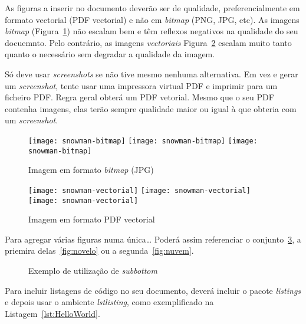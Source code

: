 As figuras a inserir no documento deverão ser de qualidade, preferencialmente em formato vectorial (PDF vectorial) e não em \emph{bitmap} (PNG, JPG, etc). As imagens \emph{bitmap} (Figura~\ref{fig:Figuras_Tree_silhouettes-bitmap}) não escalam bem e têm reflexos negativos na qualidade do seu docuemnto.  Pelo contrário, as imagens \emph{vectoriais} {Figura~\ref{fig:Figuras_Tree_silhouettes-vectorial}} escalam muito tanto quanto o necessário sem degradar a qualidade da imagem.

Só deve usar \emph{screenshots} se não tive mesmo nenhuma alternativa.  Em vez e gerar um \emph{screenshot}, tente usar uma impressora virtual PDF e imprimir para um ficheiro PDF. Regra geral obterá um PDF vetorial. Mesmo que o seu PDF contenha imagens, elas terão sempre qualidade maior ou igual à que obteria com um \emph{screenshot}.


\begin{figure}[htbp]
	\centering
	\texttt{[image: snowman-bitmap]}
	\texttt{[image: snowman-bitmap]}
	\texttt{[image: snowman-bitmap]}
	\caption{Imagem em formato \emph{bitmap} (JPG)}
	\label{fig:Figuras_Tree_silhouettes-bitmap}
\end{figure}

\begin{figure}[htbp]
	\centering
	\texttt{[image: snowman-vectorial]}
	\texttt{[image: snowman-vectorial]}
	\texttt{[image: snowman-vectorial]}
	\caption{Imagem em formato PDF vectorial}
	\label{fig:Figuras_Tree_silhouettes-vectorial}
\end{figure}

Para agregar várias figuras numa única… Poderá assim referenciar o conjunto~\ref{fig:figura-completa}, a priemira delas~\ref{fig:novelo} ou a segunda~\ref{fig:nuvem}.


\begin{figure}[htbp]
	\centering
\qquad\qquad
  \caption{Exemplo de utilização de \emph{subbottom}}
  \label{fig:figura-completa}
\end{figure}


Para incluir listagens de código no seu documento, deverá incluir o pacote \emph{listings} e depois usar o ambiente \emph{lstlisting}, como exemplificado na Listagem~\ref{lst:HelloWorld}.

